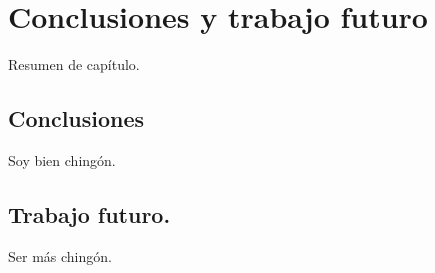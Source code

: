 \chapter{Conclusiones y trabajo futuro}
\label{ch:conc}
Resumen de capítulo.

	\section{Conclusiones}
		\label{sec:conc}
		Soy bien chingón.

	\section{Trabajo futuro.}
		\label{sec:future}
		Ser más chingón.

